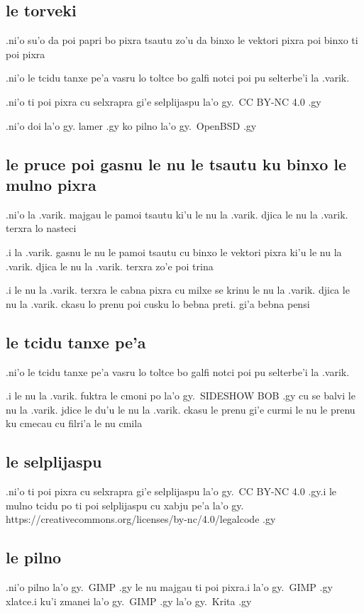 \documentclass{report}
\begin{document}
\subsection{le torveki}
.ni'o su'o da poi papri bo pixra tsautu zo'u da binxo le vektori pixra poi binxo ti poi pixra

.ni'o le tcidu tanxe pe'a vasru lo toltce bo galfi notci poi pu selterbe'i la .varik.

.ni'o ti poi pixra cu selxrapra gi'e selplijaspu la'o gy.\ CC BY-NC 4.0 .gy

.ni'o doi la'o gy. lamer .gy ko pilno la'o gy.\ OpenBSD .gy

\subsection{le pruce poi gasnu le nu le tsautu ku binxo le mulno pixra}
.ni'o la .varik. majgau le pamoi tsautu ki'u le nu la .varik. djica le nu la .varik. terxra lo nasteci

.i la .varik. gasnu le nu le pamoi tsautu cu binxo le vektori pixra ki'u le nu la .varik. djica le nu la .varik. terxra zo'e poi trina

.i le nu la .varik. terxra le cabna pixra cu milxe se krinu le nu la .varik. djica le nu la .varik. ckasu lo prenu poi cusku lo bebna preti. gi'a bebna pensi

\subsection{le tcidu tanxe pe'a}
.ni'o le tcidu tanxe pe'a vasru lo toltce bo galfi notci poi pu selterbe'i la .varik.

.i le nu la .varik. fuktra le cmoni po la'o gy.\ SIDESHOW BOB .gy cu se balvi le nu la .varik. jdice le du'u le nu la .varik. ckasu le prenu gi'e curmi le nu le prenu ku cmecau cu filri'a le nu cmila

\subsection{le selplijaspu}
.ni'o ti poi pixra cu selxrapra gi'e selplijaspu la'o gy.\ CC BY-NC 4.0 .gy\@ .i le mulno tcidu po ti poi selplijaspu cu xabju pe'a la'o gy. https://creativecommons.org/licenses/by-nc/4.0/legalcode .gy

\subsection{le pilno}
.ni'o pilno la'o gy.\ GIMP .gy le nu majgau ti poi pixra\@ .i  la'o gy.\ GIMP .gy xlatce\@ .i ku'i zmanei la'o gy.\ GIMP .gy la'o gy.\ Krita .gy
\end{document}
